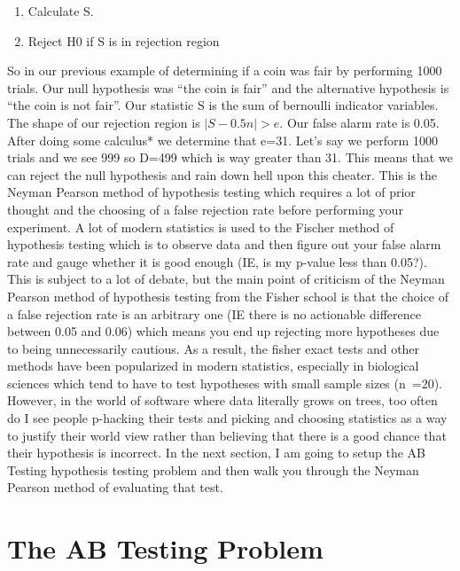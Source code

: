 \begin{enumerate}
\item Calculate S.
\item Reject H0 if S is in rejection region
\end{enumerate}

So in our previous example of determining if a coin was fair by performing 1000 trials. Our null hypothesis was “the coin is fair” and the 
alternative hypothesis is “the coin is not fair”. Our statistic S is the sum of bernoulli indicator variables. The shape of our rejection 
region is $|S-0.5n|>e$. Our false alarm rate is 0.05. After doing some calculus* we determine that e=31. Let’s say we perform 1000 trials 
and we see 999 so D=499 which is way greater than 31. This means that we can reject the null hypothesis and rain down hell upon this cheater. 
This is the Neyman Pearson method of hypothesis testing which requires a lot of prior thought and the choosing of a false rejection rate 
before performing your experiment. A lot of modern statistics is used to the Fischer method of hypothesis testing which is to observe data 
and then figure out your false alarm rate and gauge whether it is good enough (IE, is my p-value less than 0.05?). 
This is subject to a lot of debate, but the main point of criticism of the Neyman Pearson method of hypothesis testing from the Fisher school 
is that the choice of a false rejection rate is an arbitrary one (IE there is no actionable difference between 0.05 and 0.06) which means you 
end up rejecting more hypotheses due to being unnecessarily cautious. As a result, the fisher exact tests and other methods have been 
popularized in modern statistics, especially in biological sciences which tend to have to test hypotheses with small sample sizes (n~=20). 
However, in the world of software where data literally grows on trees, too often do I see people p-hacking their tests and picking and choosing 
statistics as a way to justify their world view rather than believing that there is a good chance that their hypothesis is incorrect. 
In the next section, I am going to setup the AB Testing hypothesis testing problem and then walk you through the Neyman Pearson method 
of evaluating that test.


\section{The AB Testing Problem}

